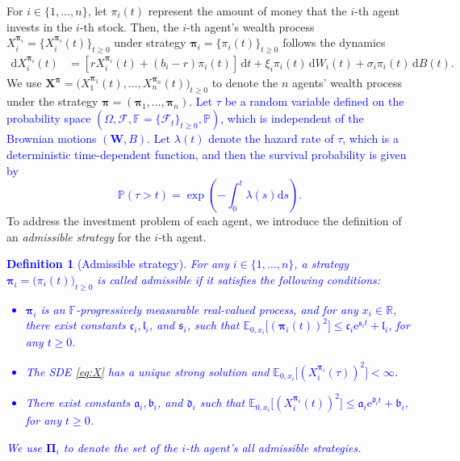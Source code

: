 \documentclass[11pt]{article}
\newtheorem{definition}{Definition}[section]
\newcommand \drm {\mathrm{d}}
\newcommand \E {\mathbb{E}}
\newcommand \e {\mathrm{e}}
\numberwithin{equation}{section}
\newcommand{\blue}[1]{\textcolor{blue}{#1}}
\newcommand{\bpi}{\boldsymbol{\pi}}
\begin{document}
	For $i\in\{1,\ldots,n\}$, let $\pi_i(t)$ represent the amount of money that the $i$-th agent invests in the $i$-th stock. Then, the $i$-th agent's wealth process $X^{\boldsymbol{\pi}_i}_i=\{X^{{\boldsymbol{\pi}}_i}_i(t)\}_{t\geq 0}$ under strategy ${\boldsymbol{\pi}}_i = \{\pi_i(t)\}_{t \ge 0}$ follows the dynamics
\begin{align}
\drm X^{\boldsymbol{\pi}_i}_i (t)
&= [r X^{\boldsymbol{\pi}_i}_i(t) + (b_i - r) \pi_i(t)] \, \drm t + \xi_i \pi_i(t) \, \drm W_i(t) + \sigma_i \pi_i(t) \, \drm B(t).\label{eq:X}
	\end{align}
We use \(\bm{X}^{\boldsymbol{\pi}}=\big(X^{\boldsymbol{\pi}_1}_1(t),\ldots, X^{\boldsymbol{\pi}_n}_n(t)\big)_{t\geq 0}\) to denote the \(n\) agents' wealth process under the strategy $\boldsymbol{\pi} = (\boldsymbol{\pi}_1,\ldots, \boldsymbol{\pi}_n)$.
\blue{Let $\tau$ be a random variable defined on the probability space $(\Omega, \mathcal{F}, \mathbb{F}=\{\mathcal{F}_t\}_{t \geq 0}, \mathbb{P})$, which is independent of the Brownian motions $(\bm{W}, B)$. Let $\lambda(t)$ denote the hazard rate of $\tau$, which is a deterministic time-dependent function, and then the survival probability is given by
	\[
	\mathbb{P}(\tau > t) = \exp\left(-\int_0^t \lambda(s) \drm s\right).
	\]
}
To address the investment problem of each agent, we introduce the definition of an \textit{admissible strategy} for the $i$-th agent.
\blue{	
\begin{definition}[Admissible strategy]\label{def:admissible}
For any \(i \in \{1,\ldots,n\}\), a strategy \( \boldsymbol{\pi}_i = \big(\pi_i(t)\big)_{t\geq 0} \) is called admissible if it satisfies the following conditions:
\begin{itemize}
\item[$(1)$] $\boldsymbol{\pi}_i$ is an $\mathbb{F}$-progressively measurable real-valued process, and for any $x_i \in \mathbb{R}$,
 there exist constants $\mathfrak{c}_i, \mathfrak{l}_i$, and $\mathfrak{s}_i$, such that $\E_{0, {x_i}} \big[\left({\bpi_i}(t)\right)^2\big]\le \mathfrak{c}_i \e^{\mathfrak{s}_i t} + \mathfrak{l}_i$, for any $t\ge0$.
\item[$(2)$] The SDE \eqref{eq:X} has a unique strong solution and $\E_{0, {x_i}} \big[\left({X}^{\bpi_i}_i(\tau)\right)^2\big]<\infty$.
\item[$(3)$] There exist constants $\mathfrak{a}_i, \mathfrak{b}_i$, and $\mathfrak{d}_i$ such that $\E_{0, {x_i}} \big[\left({X}^{\bpi_i}_i(t)\right)^2\big]\le \mathfrak{a}_i \e^{\mathfrak{d}_i t} + \mathfrak{b}_i$, for any $t\ge0$.
\end{itemize}
We use \( \boldsymbol{\Pi}_i \) to denote the set of the \(i\)-th agent's all admissible strategies.
\end{definition}
}
\end{document}
